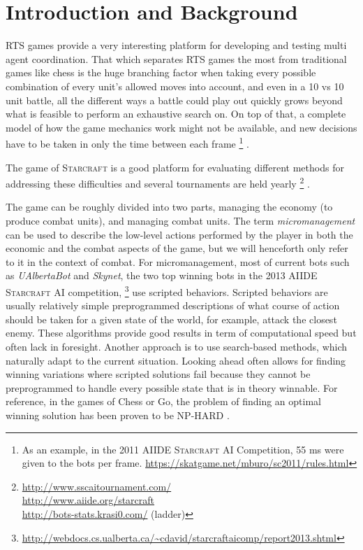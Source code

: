 \section{Introduction and Background}
RTS games provide a very interesting platform for developing and testing multi agent coordination.
That which separates RTS games the most from traditional games like chess is the huge branching factor when taking every possible combination of every unit's allowed moves into account, and even in a 10 vs 10 unit battle, all the different ways a battle could play out quickly grows beyond what is feasible to perform an exhaustive search on.
On top of that, a complete model of how the game mechanics work might not be available, and new decisions have to be taken in only the time between each frame
\footnote{
As an example, in the 2011 AIIDE \textsc{Starcraft} AI Competition, 55 ms were given to the bots per frame.
\url{https://skatgame.net/mburo/sc2011/rules.html}
}
.

The game of \textsc{Starcraft} is a good platform for evaluating different methods for addressing these difficulties and several tournaments are held yearly
\footnote{
\url{http://www.sscaitournament.com/}\\ 
\url{http://www.aiide.org/starcraft} \\
\url{http://bots-stats.krasi0.com/} (ladder)
}
.

The game can be roughly divided into two parts, managing the economy (to produce combat units), and managing combat units.
The term \emph{micromanagement} can be used to describe the low-level actions performed by the player in both the economic and the combat aspects of the game, but we will henceforth only refer to it in the context of combat.
For micromanagement, most of current bots such as \emph{UAlbertaBot} and \emph{Skynet}, the two top winning bots in the 2013 AIIDE \textsc{Starcraft} AI competition,
\footnote{\url{http://webdocs.cs.ualberta.ca/~cdavid/starcraftaicomp/report2013.shtml}
}
use scripted behaviors.
Scripted behaviors are usually relatively simple preprogrammed descriptions of what course of action should be taken for a given state of the world, for example, attack the closest enemy.
These algorithms provide good results in term of computational speed but often lack in foresight.
Another approach is to use search-based methods, which naturally adapt to the current situation.
Looking ahead often allows for finding winning variations where scripted solutions fail because they cannot be preprogrammed to handle every possible state that is in theory winnable.
For reference, in the games of Chess or Go, the problem of finding an optimal winning solution has been proven to be NP-HARD \cite{nphard}.

